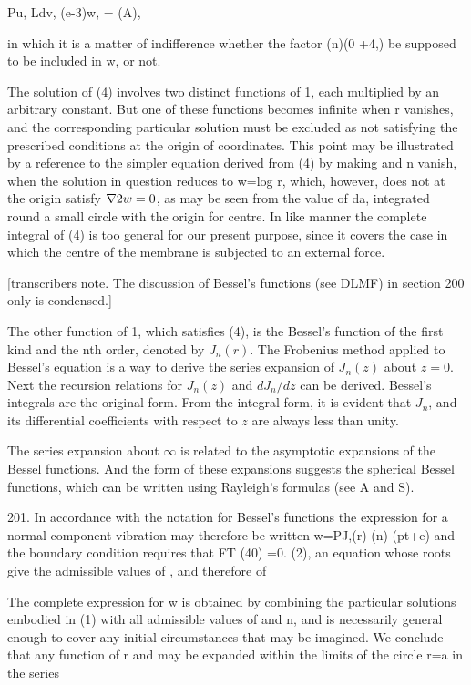 Pu, Ldv, (e-3)w, = (A),

in which it is a matter of indifference whether the factor (n)(0 +4,) be
supposed to be included in w, or not.

The solution of (4) involves two distinct functions of 1, each
multiplied by an arbitrary constant. But one of these functions becomes
infinite when r vanishes, and the corresponding particular solution must
be excluded as not satisfying the prescribed conditions at the origin of
coordinates. This point may be illustrated by a reference to the simpler
equation derived from (4) by making and n vanish, when the solution in
question reduces to w=log r, which, however, does not at the origin
satisfy \(\nabla 2 w =0\), as may be seen from the value of da,
integrated round a small circle with the origin for centre. In like
manner the complete integral of (4) is too general for our present
purpose, since it covers the case in which the centre of the membrane is
subjected to an external force.

[transcribers note.  The discussion of Bessel's functions (see DLMF)
in section 200 only is condensed.]

The other function of 1, which satisfies (4), is the Bessel's function
of the first kind and the nth order, denoted by \(J_n(r)\).
The Frobenius method applied to Bessel's equation is a way to derive the
series expansion of \(J_n(z)\) about \(z=0\).
Next the recursion relations for \(J_n(z)\) and \( d J_n/dz\) can be derived.
Bessel's integrals are the original form.
From the integral form, it is evident that
\(J_n\),
and its differential coefficients with respect to \(z\) are always less than unity.

The series expansion about \(\infty\) is related to the asymptotic expansions
of the Bessel functions.  And the form of these expansions suggests the
spherical Bessel functions, which can be written using Rayleigh's formulas
(see A and S).

201. In accordance with the notation for Bessel's functions the
expression for a normal component vibration may therefore be written
w=PJ,(r) (n) (pt+e) and the boundary condition requires that FT (40) =0.
(2),
an equation whose roots give the admissible values of , and therefore of

The complete expression for w is obtained by combining the particular
solutions embodied in (1) with all admissible values of and n, and is
necessarily general enough to cover any initial circumstances that may
be imagined. We conclude that any function of r and may be expanded
within the limits of the circle r=a in the series

